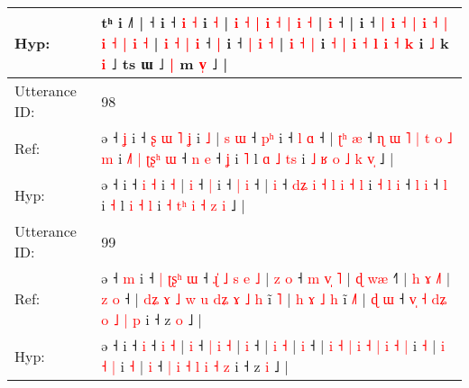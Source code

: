 \documentclass[10pt]{article}
\DeclareRobustCommand{\hl}[1]{{\textcolor{red}{#1}}}
\begin{document}
\begin{longtable}{ll}
 \\
Hyp: & tʰ i ˩˥ |\hl{}\hl{} ˧\hl{}\hl{} i ˧\hl{}\hl{}\hl{}\hl{} \hl{i} \hl{˧} i \hl{˧} |\hl{}\hl{} \hl{i} \hl{˧} \hl{}\hl{}\hl{|} \hl{i} \hl{˧} \hl{}\hl{|} \hl{i} \hl{˧} |\hl{}\hl{}\hl{}\hl{} \hl{i} ˧\hl{}\hl{}\hl{}\hl{}\hl{} |\hl{}\hl{} i\hl{} ˧ \hl{|} \hl{i} \hl{˧} \hl{|} \hl{i} \hl{˧} \hl{|} \hl{i} \hl{˧} \hl{}\hl{|} \hl{i} \hl{˧} | \hl{i} \hl{˧} \hl{|} \hl{i} ˧ \hl{|} i ˧ \hl{}\hl{|} \hl{i} \hl{˧} |\hl{}\hl{} \hl{i} \hl{˧} \hl{|} i \hl{˧} \hl{}\hl{}\hl{|} \hl{i} \hl{˧} \hl{l} \hl{i} \hl{˧} \hl{k} i \hl{˩} k \hl{}\hl{i} ˩ ts ɯ ˩\hl{ }\hl{|} m \hl{v}\hl{̩} ˩ |
 \\
\midrule
Utterance ID: & 98 \\
Ref: & ə ˧\hl{ }\hl{ʝ} i ˧\hl{ }\hl{ʂ}\hl{ }\hl{ɯ} \hl{˥} \hl{ʝ} i \hl{˩} |\hl{ }\hl{s} \hl{ɯ} ˧ \hl{p}\hl{ʰ} i ˧ \hl{l} \hl{ɑ} ˧ |\hl{ }\hl{ʈ}\hl{ʰ} \hl{æ} ˧ \hl{ɳ}\hl{ }\hl{ɯ} \hl{˥} \hl{|} \hl{t} \hl{o} \hl{˩} \hl{m} i\hl{ }\hl{˩}\hl{˥} \hl{|} \hl{ʈ}\hl{ʂ}\hl{ʰ} \hl{ɯ} ˧ \hl{n} \hl{e} ˧ \hl{ʝ} i \hl{˥} l \hl{ɑ} \hl{˩} \hl{t}\hl{s} i \hl{˩} \hl{}\hl{ʁ} \hl{o} \hl{˩} \hl{k} \hl{v}\hl{̩} ˩ |
 \\
Hyp: & ə ˧\hl{}\hl{} i ˧\hl{}\hl{}\hl{}\hl{} \hl{i} \hl{˧} i \hl{˧} |\hl{}\hl{} \hl{i} ˧ \hl{}\hl{|} i ˧ \hl{|} \hl{i} ˧ |\hl{}\hl{}\hl{} \hl{i} ˧ \hl{}\hl{d}\hl{ʑ} \hl{i} \hl{˧} \hl{l} \hl{i} \hl{˧} \hl{l} i\hl{}\hl{}\hl{} \hl{˧} \hl{}\hl{}\hl{l} \hl{i} ˧ \hl{l} \hl{i} ˧ \hl{l} i \hl{˧} l \hl{i} \hl{˧} \hl{}\hl{l} i \hl{˧} \hl{t}\hl{ʰ} \hl{i} \hl{˧} \hl{z} \hl{}\hl{i} ˩ |
 \\
\midrule
Utterance ID: & 99 \\
Ref: & ə ˧\hl{ }\hl{m} i ˧\hl{ }\hl{|}\hl{ }\hl{ʈ}\hl{ʂ}\hl{ʰ} \hl{ɯ} ˧\hl{ }\hl{ɻ}\hl{̍}\hl{ }\hl{˩}\hl{ }\hl{s} \hl{e} \hl{˩} |\hl{ }\hl{z} \hl{o} ˧ \hl{m} \hl{v}\hl{̩} \hl{˥} |\hl{ }\hl{ɖ} \hl{w}\hl{æ} ˧\hl{˥} |\hl{ }\hl{h} \hl{ɤ} \hl{˩}\hl{˥} |\hl{ }\hl{z} \hl{o} ˧ | \hl{d}\hl{ʑ} \hl{ɤ} \hl{˩} \hl{w} \hl{u} \hl{d}\hl{ʑ} \hl{ɤ} \hl{˩} \hl{h} i\hl{̃} \hl{˥} |\hl{ }\hl{h} \hl{ɤ} \hl{˩} \hl{h} i\hl{̃} \hl{˩}\hl{˥} |\hl{ }\hl{ɖ} \hl{ɯ} ˧ \hl{v}\hl{̩} \hl{˧} \hl{d}\hl{ʑ} \hl{o} \hl{˩} \hl{|} \hl{p} i ˧ z \hl{o} ˩ |
 \\
Hyp: & ə ˧\hl{}\hl{} i ˧\hl{}\hl{}\hl{}\hl{}\hl{}\hl{} \hl{i} ˧\hl{}\hl{}\hl{}\hl{}\hl{}\hl{}\hl{} \hl{i} \hl{˧} |\hl{}\hl{} \hl{i} ˧ \hl{|} \hl{}\hl{i} \hl{˧} |\hl{}\hl{} \hl{}\hl{i} ˧\hl{} |\hl{}\hl{} \hl{i} \hl{}\hl{˧} |\hl{}\hl{} \hl{i} ˧ | \hl{}\hl{i} \hl{˧} \hl{|} \hl{i} \hl{˧} \hl{}\hl{|} \hl{i} \hl{˧} \hl{|} i\hl{} \hl{˧} |\hl{}\hl{} \hl{i} \hl{˧} \hl{|} i\hl{} \hl{}\hl{˧} |\hl{}\hl{} \hl{i} ˧ \hl{}\hl{|} \hl{i} \hl{}\hl{˧} \hl{l} \hl{i} \hl{˧} \hl{z} i ˧ z \hl{i} ˩ |

\end{longtable}
\end{document}
